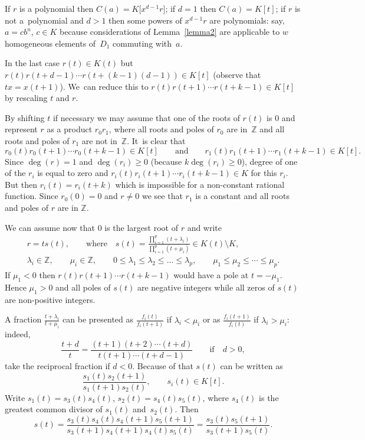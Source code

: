 \documentclass[10pt,a4paper]{amsart}
\numberwithin{equation}{section}
\newcommand{\Z}{\mathbb Z}
\newcommand{\la}{\lambda}
\begin{document}
If $r$ is a polynomial then $C(a) = K\big[x^{d-1}r\big]$; if $d = 1$ then $C(a) = K[t]$; if $r$ is not a~polynomial and $d > 1$ then some powers of $x^{d-1}r$ are polynomials: say, $a = cb^n$, $c\in K$ because considerations of Lemma~\ref{lemma2} are applicable to $w$ homogeneous elements of~$D_1$ commuting with~$a$.

In the last case
$r(t) \in K(t)$ but $r(t)r(t+d - 1)\cdots r(t + (k-1)(d-1)) \in K[t]$ (observe that $tx = x(t + 1)$). We~can reduce this to $r(t)r(t+1)\cdots r(t + k -1) \in K[t]$ by rescaling $t$ and $r$.

By shifting $t$ if necessary we may assume that one of the roots of $r(t)$ is
$0$ and represent $r$ as a product
$r_0r_1$, where all roots and poles of $r_0$ are
in~$\Z$ and all roots and poles of $r_1$ are not in~$\Z$. It~is clear that
\[
r_0(t)r_0(t+1)\cdots r_0(t + k -1) \in K[t]\qquad \text{and}\qquad
r_1(t)r_1(t+1)\cdots r_1(t + k-1) \in K[t].
\]
Since $\deg(r) = 1$ and $\deg(r_i) \geq 0$ (because $k\deg(r_i)
\geq 0$), degree of one of the $r_i$ is equal to zero and
$r_i(t)r_i(t+1)\cdots r_i(t + k - 1) \in K$ for this $r_i$. But then $r_i(t) = r_i(t + k)$
which is impossible for a
non-constant rational function. Since $r_0(0) = 0$ and $r \neq 0$ we see that
$r_1$ is a constant and all roots and poles of $r$ are in $\Z$.

We can assume now that $0$ is the largest root of $r$ and write
\begin{gather*}
r = ts(t),\qquad
\text{where}\quad
s(t) = \frac{\prod_{i=1}^p (t + \la_i)}{\prod_{i=1}^p (t + \mu_i)} \in
K(t) \setminus K,
\\
\la_i \in \Z, \qquad
\mu_i \in \Z,\qquad
0 \leq \la_1 \leq \la_2 \leq \dots \leq \la_p, \qquad
\mu_1\leq \mu_2 \leq \cdots \leq \mu_p.
\end{gather*}
If $\mu_1 < 0$ then $r(t)r(t+1)\cdots r(t + k -1)$
would have a pole at $t = -\mu_1$. Hence $\mu_1 > 0$ and all poles of $s(t)$
are negative integers while all zeros of $s(t)$ are non-positive integers.

A fraction $\frac{t + \la_i}{t + \mu_i}$ can be presented as $\frac{f_i(t)}{f_i(t+1)}$ if $\la_i < \mu_i$ or as $\frac{f_i(t+1)}{f_i(t)}$ if $\la_i > \mu_i$: indeed,
\[
\frac{t + d}{t} = \frac{(t+1) (t+2) \cdots(t+d)}{t(t+1)\cdots (t+d-1)}\qquad \text{if}\quad d > 0,
\]
take the reciprocal fraction if $d < 0$. Because of that $s(t)$ can be written as
\[
\frac{s_1(t)s_2(t+1)}{s_1(t+1)s_2(t)}, \qquad
s_i(t) \in K[t].
\]
Write
$s_1(t) = s_3(t)s_4(t)$, $s_2(t) =s_4(t)s_5(t)$,
where $s_4(t)$ is the greatest common divisor of $s_1(t)$ and~$s_2(t)$. Then
\[
s(t) = \frac{s_3(t)s_4(t)s_4(t+1)s_5(t+1)}{s_3(t+1)s_4(t+1)s_4(t)s_5(t)} = \frac{s_3(t)s_5(t+1)}{s_3(t+1)s_5(t)}.
\]
\end{document}
